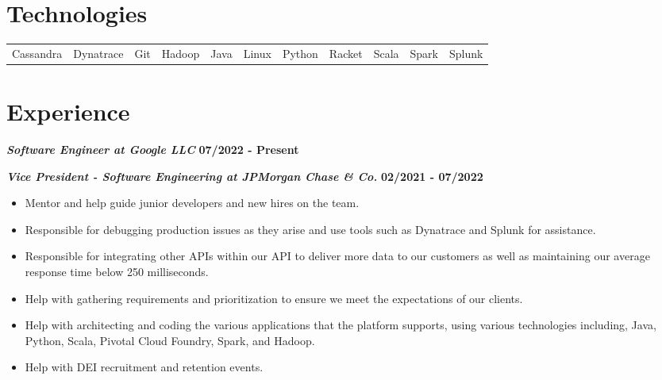 \documentclass[10pt]{res}
\begin{document}
\address{www.anthonyhicksiii.com}
\address{anthony@anthonyhicksiii.com}

\setlength\itemsep{0em}

\begin{resume}
\section{Technologies}
\begin{tabular}{	l	l	l	l	l	l	l	l	l	l	l	}
	Cassandra & Dynatrace & Git & Hadoop & Java & Linux & Python & Racket & Scala & Spark & Splunk
\end{tabular}

\section{Experience}
	\textbf{\textit{Software Engineer at Google LLC}}
	\hfill{\bf 07/2022 - Present}
	
	\textbf{\textit{Vice President - Software Engineering at JPMorgan Chase \& Co.}}
	\hfill{\bf 02/2021 - 07/2022}
	\begin{itemize}
		\item Mentor and help guide junior developers and new hires on the team.
		\item Responsible for debugging production issues as they arise and use tools such as Dynatrace and Splunk for
assistance.
		\item Responsible for integrating other APIs within our API to deliver more data to our customers as well as maintaining our average response time below 250 milliseconds.
		\item Help with gathering requirements and prioritization to ensure we meet the expectations of our clients.
		\item Help with architecting and coding the various applications that the platform supports, using various technologies
including, Java, Python, Scala, Pivotal Cloud Foundry, Spark, and Hadoop.		
		\item Help with DEI recruitment and retention events.
	\end{itemize}
	

\end{resume}
\end{document}

